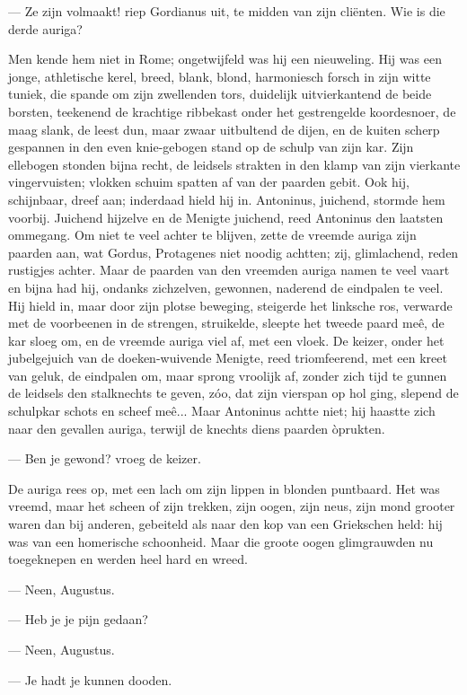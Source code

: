 \documentclass[a4paper, 12pt, oneside, dutch]{article}
\begin{document}
--- Ze zijn volmaakt! riep Gordianus uit, te midden van zijn cliënten. Wie is die derde auriga?

Men kende hem niet in Rome; ongetwijfeld was hij een nieuweling. Hij was een jonge, athletische kerel, breed, blank, blond, harmoniesch forsch in zijn witte tuniek, die spande om zijn zwellenden tors, duidelijk uitvierkantend de beide borsten, teekenend de krachtige ribbekast onder het gestrengelde koordesnoer, de maag slank, de leest dun, maar zwaar uitbultend de dijen, en de kuiten scherp gespannen in den even knie-gebogen stand op de schulp van zijn kar. Zijn ellebogen stonden bijna recht, de leidsels strakten in den klamp van zijn vierkante vingervuisten; vlokken schuim spatten af van der paarden gebit. Ook hij, schijnbaar, dreef aan; inderdaad hield hij in. Antoninus, juichend, stormde hem voorbij. Juichend hijzelve en de Menigte juichend, reed Antoninus den laatsten ommegang. Om niet te veel achter te blijven, zette de vreemde auriga zijn paarden aan, wat Gordus, Protagenes niet noodig achtten; zij, glimlachend, reden rustigjes achter. Maar de paarden van den vreemden auriga namen te veel vaart en bijna had hij, ondanks zichzelven, gewonnen, naderend de eindpalen te veel. Hij hield in, maar door zijn plotse beweging, steigerde het linksche ros, verwarde met de voorbeenen in de strengen, struikelde, sleepte het tweede paard meê, de kar sloeg om, en de vreemde auriga viel af, met een vloek. De keizer, onder het jubelgejuich van de doeken-wuivende Menigte, reed triomfeerend, met een kreet van geluk, de eindpalen om, maar sprong vroolijk af, zonder zich tijd te gunnen de leidsels den stalknechts te geven, zóo, dat zijn vierspan op hol ging, slepend de schulpkar schots en scheef meê... Maar Antoninus achtte niet; hij haastte zich naar den gevallen auriga, terwijl de knechts diens paarden òprukten.

--- Ben je gewond? vroeg de keizer.

De auriga rees op, met een lach om zijn lippen in blonden puntbaard. Het was vreemd, maar het scheen of zijn trekken, zijn oogen, zijn neus, zijn mond grooter waren dan bij anderen, gebeiteld als naar den kop van een Griekschen held: hij was van een homerische schoonheid. Maar die groote oogen glimgrauwden nu toegeknepen en werden heel hard en wreed.

--- Neen, Augustus.

--- Heb je je pijn gedaan?

--- Neen, Augustus.

--- Je hadt je kunnen dooden.
\end{document}
